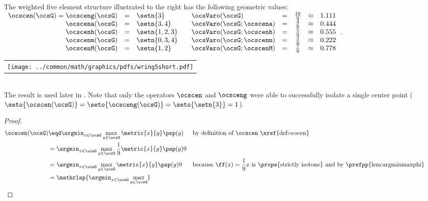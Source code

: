 \begin{tabstr}{0.75}
\begin{minipage}{\tw-65mm}%
\begin{example}%
\label{ex:wring5short}
The weighted five element structure illustrated to the right has the following geometric values:
\\\indentx$\begin{array}{rcl@{\qquad} lcccl}
    \ocscen(\ocsG)=\ocsceng(\ocsG) &=&\setn{3}      & \ocsVaro(\ocsG)          &=& \frac{10}{9} &\approx& 1.111 \\
    \ocscena(\ocsG)                &=&\setn{3,4}    & \ocsVaro(\ocsG;\ocscena) &=& \frac{ 4}{9} &\approx& 0.444  \\
    \ocscenh(\ocsG)                &=&\setn{1,2,3}  & \ocsVaro(\ocsG;\ocscenh) &=& \frac{ 5}{9} &\approx& 0.555  \\
    \ocscenm(\ocsG)                &=&\setn{0,3,4}  & \ocsVaro(\ocsG;\ocscenm) &=& \frac{ 2}{9} &\approx& 0.222  \\
    \ocscenM(\ocsG)                &=&\setn{1,2}    & \ocsVaro(\ocsG;\ocscenM) &=& \frac{7}{9}  &\approx& 0.778
  \end{array}$.
\end{example}
\end{minipage}\hfill%
\begin{tabular}{c}
  \gsize%
  {\texttt{[image: ../common/math/graphics/pdfs/wring5short.pdf]}}%
\end{tabular}
\\
The  result is used later in .
Note that only the operators $\ocscen$ and $\ocsceng$ were able to successfully isolate a single center point
($\seto{\ocscen(\ocsG)}=\seto{\ocsceng(\ocsG)}=\seto{\setn{3}}=1$).
\\
\begin{proof}
  \begin{align*}
      \ocscen(\ocsG)
        &\eqd \argmin_{x\in\ocsG}\max_{y\in\ocsG}\metric{x}{y}\psp(y)
        &&\text{by definition of $\ocscen$ \xref{def:ocscen}}
      \\&= \argmin_{x\in\ocsG}\max_{y\in\ocsG}\frac{1}{9}\metric{x}{y}\psp(y)9
      \\&= \argmin_{x\in\ocsG}\max_{y\in\ocsG}\metric{x}{y}\psp(y)9
        &&\text{because $\ff(x)=\frac{1}{9}x$ is \prope{strictly isotone} and by \prefpp{lem:argminmaxphi}}
      \\&=\mathrlap{\argmin_{x\in\ocsG}\max_{y\in\ocsG}
}
\end{align*}
\end{proof}
\end{tabstr}
